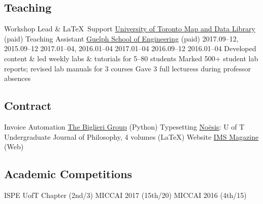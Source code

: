 \subsection{Teaching}
  {Workshop Lead \& \LaTeX\ Support}
  {\href{https://mdl.library.utoronto.ca}{University of Toronto Map and Data Library} (paid)}
  {Teaching Assistant}
  {\href{https://www.uoguelph.ca/engineering}{Guelph School of Engineering} (paid)}
     {2017.09--12, 2015.09--12}
       {2017.01--04, 2016.01--04}
     {2017.01--04}
              {2016.09--12}
   {2016.01--04}
  \bullet Developed content \& led weekly labs \& tutorials for 5--80 students
  \bullet Marked 500+ student lab reports; revised lab manuals for 3 courses
  \bullet Gave 3 full lecturess during professor absences
\subsection{Contract}
  {Invoice Automation} %
  {\href{https://www.thebiglierigroup.com}{The Biglieri Group} (Python)}
  {Typesetting} %
  {\href{https://www.noesisjournal.com}{No\={e}sis}: U of T Undergraduate Journal of Philosophy, 4 volumes (\LaTeX)}
  {Website} %
  {\href{https://www.imsmagazine.com}{IMS Magazine} (Web)}
\subsection{Academic Competitions}
  {}
  {ISPE UofT Chapter (2nd/3)}
  {}
  {MICCAI 2017 (15th/20)}
  {}
  {MICCAI 2016 (4th/15)}

